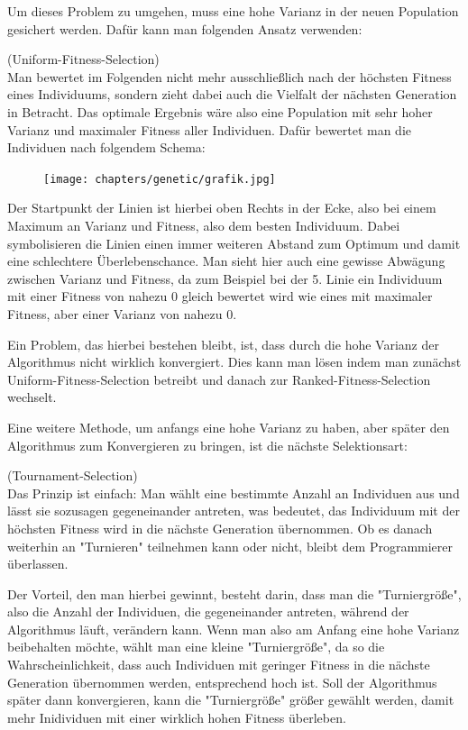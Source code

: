 Um dieses Problem zu umgehen, muss eine hohe Varianz in der neuen Population gesichert werden. Dafür kann man folgenden Ansatz verwenden:
\begin{algo}(Uniform-Fitness-Selection)\\
	Man bewertet im Folgenden nicht mehr ausschließlich nach der höchsten Fitness eines Individuums, sondern zieht dabei auch die Vielfalt der nächsten Generation in Betracht. Das optimale Ergebnis wäre also eine Population mit sehr hoher Varianz und maximaler Fitness aller Individuen. Dafür bewertet man die Individuen nach folgendem Schema:
	\begin{figure}[h]
		\texttt{[image: chapters/genetic/grafik.jpg]}
	\end{figure}
	
	Der Startpunkt der Linien ist hierbei oben Rechts in der Ecke, also bei einem Maximum an Varianz und Fitness, also dem besten Individuum. Dabei symbolisieren die Linien einen immer weiteren Abstand zum Optimum und damit eine schlechtere Überlebenschance. Man sieht hier auch eine gewisse Abwägung zwischen Varianz und Fitness, da zum Beispiel bei der 5. Linie ein Individuum mit einer Fitness von nahezu 0 gleich bewertet wird wie eines mit maximaler Fitness, aber einer Varianz von nahezu 0.
	
	Ein Problem, das hierbei bestehen bleibt, ist, dass durch die hohe Varianz der Algorithmus nicht wirklich konvergiert. Dies kann man lösen indem man zunächst Uniform-Fitness-Selection betreibt und danach zur Ranked-Fitness-Selection wechselt.
\end{algo}
Eine weitere Methode, um anfangs eine hohe Varianz zu haben, aber später den Algorithmus zum Konvergieren zu bringen, ist die nächste Selektionsart:
\begin{algo}(Tournament-Selection)\\
	Das Prinzip ist einfach: Man wählt eine bestimmte Anzahl an Individuen aus und lässt sie sozusagen gegeneinander antreten, was bedeutet, das Individuum mit der höchsten Fitness wird in die nächste Generation übernommen. Ob es danach weiterhin an "Turnieren" teilnehmen kann oder nicht, bleibt dem Programmierer überlassen.

	Der Vorteil, den man hierbei gewinnt, besteht darin, dass man die "Turniergröße", also die Anzahl der Individuen, die gegeneinander antreten, während der Algorithmus läuft, verändern kann. Wenn man also am Anfang eine hohe Varianz beibehalten möchte, wählt man eine kleine "Turniergröße", da so die Wahrscheinlichkeit, dass auch Individuen mit geringer Fitness in die nächste Generation übernommen werden, entsprechend hoch ist. Soll der Algorithmus später dann konvergieren, kann die "Turniergröße" größer gewählt werden, damit mehr Inidividuen mit einer wirklich hohen Fitness überleben.
\end{algo}
